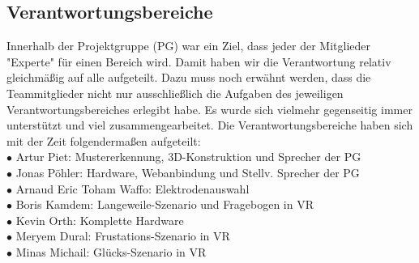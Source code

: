\subsection{Verantwortungsbereiche}
Innerhalb der Projektgruppe (PG) war ein Ziel, dass jeder der Mitglieder "Experte" für einen Bereich wird. Damit haben wir die Verantwortung relativ gleichmäßig auf alle aufgeteilt. Dazu muss noch erwähnt werden, dass die Teammitglieder nicht nur ausschließlich die Aufgaben des jeweiligen Verantwortungsbereiches erlegibt habe. Es wurde sich vielmehr gegenseitig immer unterstützt und viel zusammengearbeitet. Die Verantwortungsbereiche haben sich mit der Zeit folgendermaßen aufgeteilt: \\

$ \bullet $ Artur Piet: Mustererkennung, 3D-Konstruktion und Sprecher der PG \\
$ \bullet $ Jonas Pöhler: Hardware, Webanbindung und Stellv. Sprecher der PG \\
$ \bullet $ Arnaud Eric Toham Waffo: Elektrodenauswahl \\
$ \bullet $ Boris Kamdem: Langeweile-Szenario und Fragebogen in VR \\
$ \bullet $ Kevin Orth: Komplette Hardware \\
$ \bullet $ Meryem Dural: Frustations-Szenario in VR \\
$ \bullet $ Minas Michail: Glücks-Szenario in VR \\






